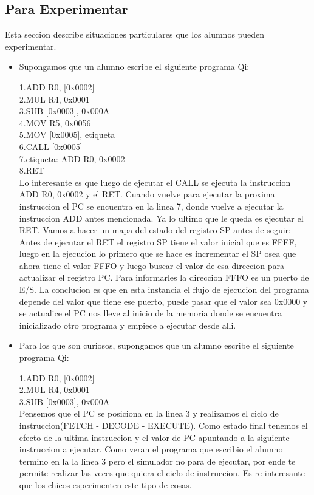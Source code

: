 \subsection{Para Experimentar}

Esta seccion describe situaciones particulares que los alumnos pueden experimentar.

\begin{itemize}

\item Supongamos que un alumno escribe el siguiente programa Qi:

1.ADD R0, [0x0002]\\
2.MUL R4, 0x0001 \\
3.SUB [0x0003], 0x000A \\
4.MOV R5, 0x0056 \\
5.MOV [0x0005], etiqueta \\
6.CALL [0x0005] \\
7.etiqueta: ADD R0, 0x0002 \\
8.RET \\

Lo interesante es que luego de ejecutar el CALL se ejecuta la instruccion ADD R0, 0x0002 y el RET. Cuando vuelve para ejecutar la proxima instruccion el PC se encuentra en la linea 7, donde vuelve a ejecutar la instruccion ADD antes mencionada. Ya lo ultimo que le queda es ejecutar el RET.
Vamos a hacer un mapa del estado del registro SP antes de seguir: Antes de ejecutar el RET  el registro SP tiene el valor inicial que es FFEF, luego en la ejecucion lo primero que se hace es incrementar el SP osea que ahora tiene el valor FFFO y luego buscar el valor de esa direccion para actualizar el registro PC. Para informarles la direccion FFFO es un puerto de E/S. La conclucion es que en esta instancia el flujo de ejecucion del programa depende del valor que tiene ese puerto, puede pasar que el valor sea 0x0000 y se actualice el PC nos lleve al inicio de la memoria donde se encuentra inicializado otro programa y empiece a ejecutar desde alli. 


\item Para los que son curiosos, supongamos que un alumno escribe el siguiente programa Qi:

1.ADD R0, [0x0002]\\
2.MUL R4, 0x0001 \\
3.SUB [0x0003], 0x000A \\

Pensemos que el PC se posiciona en la linea 3 y realizamos el ciclo de instruccion(FETCH - DECODE - EXECUTE). Como estado final tenemos el efecto de la ultima instruccion y el valor de PC apuntando a la siguiente instruccion a ejecutar. Como veran el programa que escribio el alumno termino en la la linea 3 pero el simulador no para de ejecutar, por ende te permite realizar las veces que quiera el ciclo de instruccion. Es re interesante que los chicos esperimenten este tipo de cosas.

\end{itemize} 


